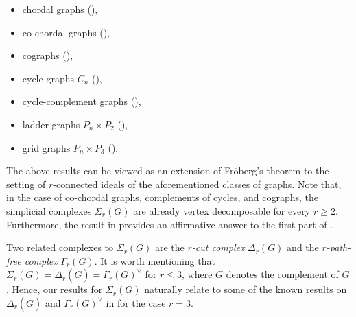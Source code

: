 \documentclass[12pt,reqno]{amsart}
\theoremstyle{definition}
\begin{document}
	\begin{itemize}
		\item[$\bullet$] chordal graphs (),
		
		\item[$\bullet$] co-chordal graphs (),

        \item[$\bullet$] cographs (),
		
		\item[$\bullet$] cycle graphs $C_n$ (),
		
		\item[$\bullet$]  cycle-complement graphs (),
		
		\item[$\bullet$] ladder graphs $P_n\times P_2$ (),
		
		\item[$\bullet$] grid graphs $P_n\times P_3$ ().
	\end{itemize}
	
The above results can be viewed as an extension of Fr\"oberg’s theorem to the setting of $r$-connected ideals of the aforementioned classes of graphs. 
Note that, in the case of co-chordal graphs, complements of cycles, and cographs, the simplicial complexes $\Sigma_r(G)$ are already vertex decomposable for every $r \ge 2$. Furthermore, the result in  provides an affirmative answer to the first part of \cite[Question 7.5]{LQCG}. 

Two related complexes to $\Sigma_r(G)$ are the \emph{$r$-cut complex} $\Delta_r(G)$ and the \emph{$r$-path-free complex} $\Gamma_r(G)$. 
It is worth mentioning that $\Sigma_r(G) = \Delta_r(\overline{G}) = \Gamma_r(G)^{\vee}$ for $r \le 3$, where $\overline{G}$ denotes the complement of $G$. 
Hence, our results for $\Sigma_r(G)$ naturally relate to some of the known results on $\Delta_r(\overline{G})$ and $\Gamma_r(G)^{\vee}$ in \cite{LQCG, TCG1, TCG2, 2025connectedideals} for the case $r = 3$.
	
\end{document}
